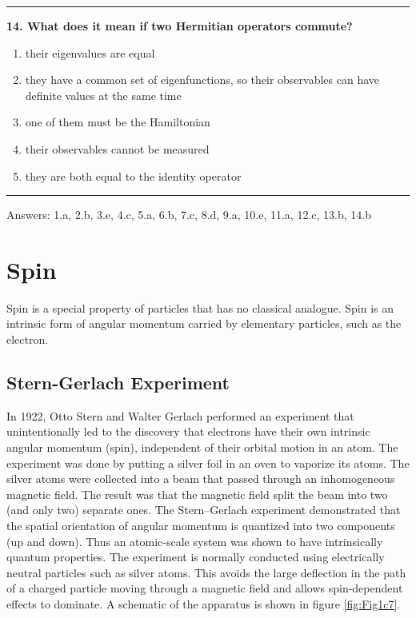 \documentclass[
  english,
  9pt,
]{extbook}
\providecommand{\tightlist}{%
  \setlength{\itemsep}{0pt}\setlength{\parskip}{0pt}}
\theoremstyle{definition}
\theoremstyle{definition}
\theoremstyle{definition}
\theoremstyle{definition}
\theoremstyle{remark}
\begin{document}
\begin{center}\rule{0.5\linewidth}{0.5pt}\end{center}

\textbf{14. What does it mean if two Hermitian operators commute?}

\begin{enumerate}
\def\labelenumi{\alph{enumi}.}
\tightlist
\item
  their eigenvalues are equal\\
\item
  they have a common set of eigenfunctions, so their observables can have definite values at the same time\\
\item
  one of them must be the Hamiltonian\\
\item
  their observables cannot be measured\\
\item
  they are both equal to the identity operator
\end{enumerate}

\begin{center}\rule{0.5\linewidth}{0.5pt}\end{center}

Answers: 1.a, 2.b, 3.e, 4.c, 5.a, 6.b, 7.c, 8.d, 9.a, 10.e, 11.a, 12.c, 13.b, 14.b

\chapter{Spin}\label{Spin}

Spin is a special property of particles that has no classical analogue. Spin is an intrinsic form of angular momentum carried by elementary particles, such as the electron.

\section{Stern-Gerlach Experiment}\label{stern-gerlach-experiment}

In 1922, Otto Stern and Walter Gerlach performed an experiment that unintentionally led to the discovery that electrons have their own intrinsic angular momentum (spin), independent of their orbital motion in an atom. The experiment was done by putting a silver foil in an oven to vaporize its atoms. The silver atoms were collected into a beam that passed through an inhomogeneous magnetic field. The result was that the magnetic field split the beam into two (and only two) separate ones. The Stern--Gerlach experiment demonstrated that the spatial orientation of angular momentum is quantized into two components (up and down). Thus an atomic-scale system was shown to have intrinsically quantum properties. The experiment is normally conducted using electrically neutral particles such as silver atoms. This avoids the large deflection in the path of a charged particle moving through a magnetic field and allows spin-dependent effects to dominate. A schematic of the apparatus is shown in figure \ref{fig:Fig1c7}.
\end{document}
